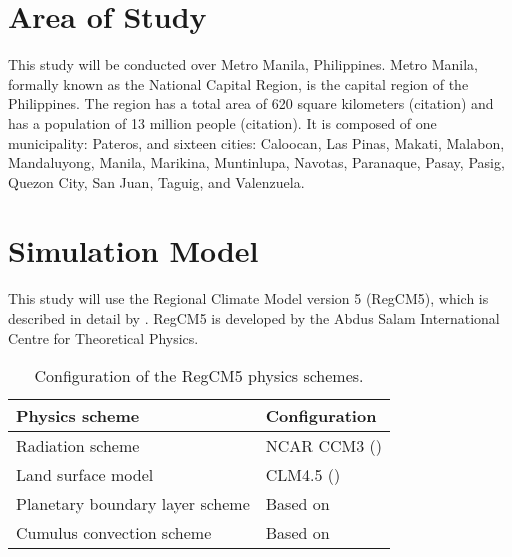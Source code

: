 \section{Area of Study}
	This study will be conducted over Metro Manila, Philippines.
	Metro Manila, formally known as the National Capital Region, is the capital region of the Philippines.
	The region has a total area of 620 square kilometers (citation)
		and has a population of 13 million people (citation).
	It is composed of one municipality: Pateros, and sixteen cities:
		Caloocan,
		Las Pinas,
		Makati,
		Malabon,
		Mandaluyong,
		Manila,
		Marikina,
		Muntinlupa,
		Navotas,
		Paranaque,
		Pasay,
		Pasig,
		Quezon City,
		San Juan,
		Taguig, and
		Valenzuela.
		
\section{Simulation Model}
	This study will use the Regional Climate Model version 5 (RegCM5), which is described in detail by \textcite{Giorgi2023}.
	RegCM5 is developed by the Abdus Salam International Centre for Theoretical Physics.
	
	\begin{table}
		\label{tab:physics-schemes}
		\caption{Configuration of the RegCM5 physics schemes.}
		\centering
		\begin{tabular}{l l}
			\hline \hline
			Physics scheme & Configuration\\
			\hline
			Radiation scheme & NCAR CCM3 (\cite{Kiehl1996}) \\
			Land surface model & CLM4.5 (\cite{Oleson2013})\\
			Planetary boundary layer scheme & Based on \textcite{Holtslag1990}\\
			Cumulus convection scheme & Based on \textcite{Emanuel1991}\\
			\hline
		\end{tabular}		
	\end{table}